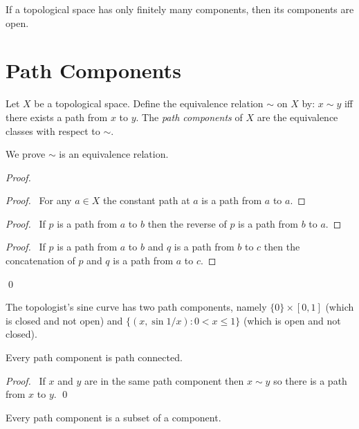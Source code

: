 \begin{cor}
If a topological space has only finitely many components, then its components are open.
\end{cor}

\section{Path Components}

\begin{df}
Let $X$ be a topological space. Define the equivalence relation $\sim$ on $X$ by: $x \sim y$ iff there exists a path from $x$ to $y$. The \emph{path components} of $X$ are the equivalence classes with respect to $\sim$.

We prove $\sim$ is an equivalence relation.
\end{df}

\begin{proof}
\pf
{}
\begin{proof}
	\pf\ For any $a \in X$ the constant path at $a$ is a path from $a$ to $a$.
\end{proof}
\begin{proof}
	\pf\ If $p$ is a path from $a$ to $b$ then the reverse of $p$ is a path from $b$ to $a$.
\end{proof}
\begin{proof}
	\pf\ If $p$ is a path from $a$ to $b$ and $q$ is a path from $b$ to $c$ then the concatenation of $p$ and $q$ is a path from $a$ to $c$.
\end{proof}
\qed
\end{proof}

\begin{ex}
The topologist's sine curve has two path components, namely $\{0\} \times [0,1]$ (which is closed and not open) and $\{ (x, \sin 1/x) : 0 < x \leq 1 \}$ (which is open and not closed).
\end{ex}

\begin{prop}
Every path component is path connected.
\end{prop}

\begin{proof}
\pf\ If $x$ and $y$ are in the same path component then $x \sim y$ so there is a path from $x$ to $y$. \qed
\end{proof}

\begin{cor}
Every path component is a subset of a component.
\end{cor}

